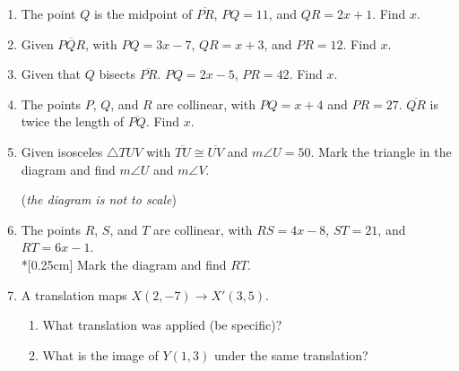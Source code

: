 \documentclass[12pt, twoside]{article}
\begin{document}
\begin{enumerate}
  \item The point $Q$ is the midpoint of $\overline{PR}$, $PQ=11$, and $QR=2x+1$. Find ${x}$.
  \vspace{4cm}
  
  \item Given $\overline{PQR}$, with $PQ=3x-7$, $QR=x+3$, and $PR=12$. Find ${x}$.
  \vspace{4cm}
  
  \item Given that $Q$ bisects $\overline{PR}$. $PQ=2x-5$, $PR=42$. Find ${x}$.
  \vspace{4cm}

  \item The points $P$, $Q$, and $R$ are collinear, with $PQ=x+4$ and $PR=27$. $\overline{QR}$ is twice the length of $\overline{PQ}$. Find ${x}$.

\newpage
    \item Given isosceles $\triangle TUV$ with $\overline{TU} \cong \overline{UV}$ and $m\angle U = 50$. Mark the triangle in the diagram and find $m\angle U$ and $m\angle V$.
  \begin{flushright}
    (\emph{the diagram is not to scale})\\
  \end{flushright}

  \item The points $R$, $S$, and $T$ are collinear, with $RS=4x-8$, $ST=21$, and $RT=6x-1$. \\*[0.25cm]
  Mark the diagram and find ${RT}$. \vspace{0.5cm}
  \begin{flushright}
    \end{flushright} \vspace{4cm}

  \item A translation maps $X(2,-7) \rightarrow X'(3,5)$. 
    \begin{enumerate}
      \item What translation was applied (be specific)?  \vspace{2cm}
      \item What is the image of $Y(1,3)$ under the same translation?
      \end{enumerate} \vspace{2cm}
  

\end{enumerate}
\end{document}
